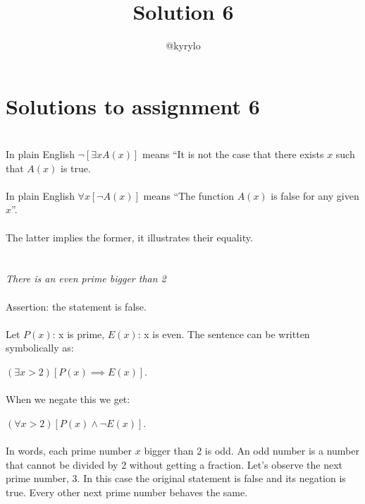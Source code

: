 \documentclass{article}
\title{Solution 6}
\author{@kyrylo}
\begin{document}
\section*{Solutions to assignment 6}

\section{}

In plain English $\neg[\exists x A(x)]$ means ``It is not the case that there
exists $x$ such that $A(x)$ is true.
\\\\
In plain English $\forall x[\neg A(x)]$ means ``The function $A(x)$ is false for
any given $x$''.
\\\\
The latter implies the former, it illustrates their equality.

\section{}

{\it There is an even prime bigger than 2}
\\\\
Assertion: the statement is false.
\\\\
Let $P(x)$: x is prime, $E(x)$: x is even. The sentence can be written
symbolically as:

$(\exists x > 2)[P(x) \implies E(x)]$.
\\\\
When we negate this we get:

$(\forall x > 2)[P(x) \wedge \neg E(x)]$.
\\\\
In words, each prime number $x$ bigger than 2 is odd. An odd number is a number
that cannot be divided by 2 without getting a fraction. Let's observe the next
prime number, 3. In this case the original statement is false and its negation
is true. Every other next prime number behaves the same.

\section{}
\end{document}

